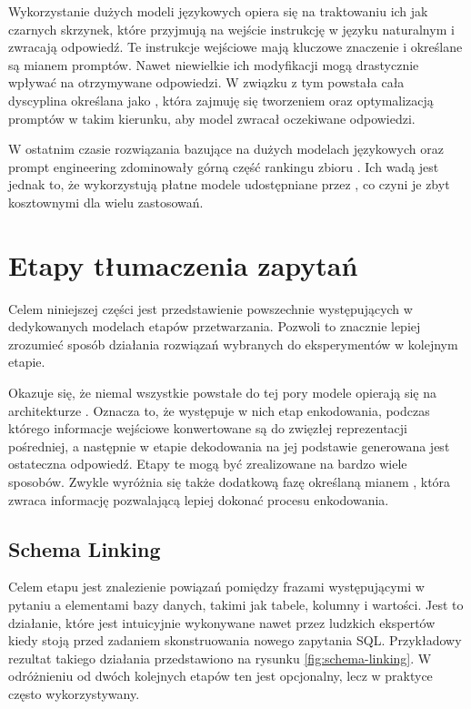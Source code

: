Wykorzystanie dużych modeli językowych opiera się na traktowaniu ich jak czarnych skrzynek, które przyjmują na wejście instrukcję w języku naturalnym i zwracają odpowiedź. Te instrukcje wejściowe mają kluczowe znaczenie i określane są mianem promptów. Nawet niewielkie ich modyfikacji mogą drastycznie wpływać na otrzymywane odpowiedzi. W związku z tym powstała cała dyscyplina określana jako , która zajmuję się tworzeniem oraz optymalizacją promptów w takim kierunku, aby model zwracał oczekiwane odpowiedzi.

W ostatnim czasie rozwiązania bazujące na dużych modelach językowych oraz prompt engineering zdominowały górną część rankingu zbioru . Ich wadą jest jednak to, że wykorzystują płatne modele udostępniane przez , co czyni je zbyt kosztownymi dla wielu zastosowań.

\section{Etapy tłumaczenia zapytań} \label{specific-stages}
Celem niniejszej części jest przedstawienie powszechnie występujących w dedykowanych modelach  etapów przetwarzania. Pozwoli to znacznie lepiej zrozumieć sposób działania rozwiązań wybranych do eksperymentów w kolejnym etapie.

Okazuje się, że niemal wszystkie powstałe do tej pory modele opierają się na architekturze . Oznacza to, że występuje w nich etap enkodowania, podczas którego informacje wejściowe konwertowane są do zwięzłej reprezentacji pośredniej, a następnie w etapie dekodowania na jej podstawie generowana jest ostateczna odpowiedź. Etapy te mogą być zrealizowane na bardzo wiele sposobów. Zwykle wyróżnia się także dodatkową fazę określaną mianem , która zwraca informację pozwalającą lepiej dokonać procesu enkodowania. 

\subsection{Schema Linking}
Celem etapu  jest znalezienie powiązań pomiędzy frazami występującymi w pytaniu a elementami bazy danych, takimi jak tabele, kolumny i wartości. Jest to działanie, które jest intuicyjnie wykonywane nawet przez ludzkich ekspertów kiedy stoją przed zadaniem skonstruowania nowego zapytania SQL. Przykładowy rezultat takiego działania przedstawiono na rysunku \ref{fig:schema-linking}. W odróżnieniu od dwóch kolejnych etapów ten jest opcjonalny, lecz w praktyce często wykorzystywany.

